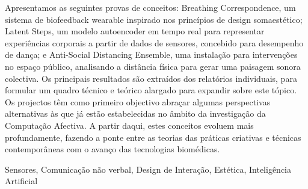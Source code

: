 Apresentamos as seguintes provas de conceitos: Breathing Correspondence, um sistema de biofeedback wearable inspirado nos princípios de design somaestético; Latent Steps, um modelo autoencoder em tempo real para representar experiências corporais a partir de dados de sensores, concebido para desempenho de dança; e Anti-Social Distancing Ensemble, uma instalação para intervenções no espaço público, analisando a distância física para gerar uma paisagem sonora colectiva. Os principais resultados são extraídos dos relatórios individuais, para formular um quadro técnico e teórico alargado para expandir sobre este tópico. Os projectos têm como primeiro objectivo abraçar algumas perspectivas alternativas às que já estão estabelecidas no âmbito da investigação da Computação Afectiva. A partir daqui, estes conceitos evoluem mais profundamente, fazendo a ponte entre as teorias das práticas criativas e técnicas contemporâneas com o avanço das tecnologias biomédicas.


\begin{keywords}
Sensores, Comunicação não verbal, Design de Interação, Estética, Inteligência Artificial 
\end{keywords}
